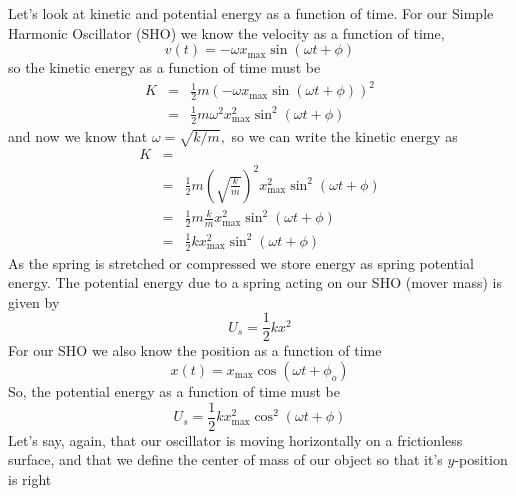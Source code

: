 \documentclass{book}
\begin{document}
Let's look at kinetic and potential energy as a function of time. For our
Simple Harmonic Oscillator (SHO) we know the velocity as a function of time,%
\begin{equation*}
v\left( t\right) =-\omega x_{\max }\sin \left( \omega t+\phi \right)
\end{equation*}%
so the kinetic energy as a function of time must be%
\begin{eqnarray*}
K &=&\frac{1}{2}m\left( -\omega x_{\max }\sin \left( \omega t+\phi \right)
\right) ^{2} \\
&=&\frac{1}{2}m\omega ^{2}x_{\max }^{2}\sin ^{2}\left( \omega t+\phi \right)
\end{eqnarray*}%
and now we know that $\omega =\sqrt{k/m},$ so we can write the kinetic
energy as 
\begin{eqnarray*}
K &=& \\
&=&\frac{1}{2}m\left( \sqrt{\frac{k}{m}}\right) ^{2}x_{\max }^{2}\sin
^{2}\left( \omega t+\phi \right) \\
&=&\frac{1}{2}m\frac{k}{m}x_{\max }^{2}\sin ^{2}\left( \omega t+\phi \right)
\\
&=&\frac{1}{2}kx_{\max }^{2}\sin ^{2}\left( \omega t+\phi \right)
\end{eqnarray*}%
As the spring is stretched or compressed we store energy as spring potential
energy. The potential energy due to a spring acting on our SHO (mover mass)
is given by 
\begin{equation}
U_{s}=\frac{1}{2}kx^{2}
\end{equation}%
For our SHO we also know the position as a function of time 
\begin{equation*}
x\left( t\right) =x_{\max }\cos \left( \omega t+\phi _{o}\right)
\end{equation*}%
So, the potential energy as a function of time must be%
\begin{equation*}
U_{s}=\frac{1}{2}kx_{\max }^{2}\cos ^{2}\left( \omega t+\phi \right)
\end{equation*}%
Let's say, again, that our
oscillator is moving horizontally on a frictionless surface, and that we
define the center of mass of our object so that it's $y$-position is right
\end{document}
